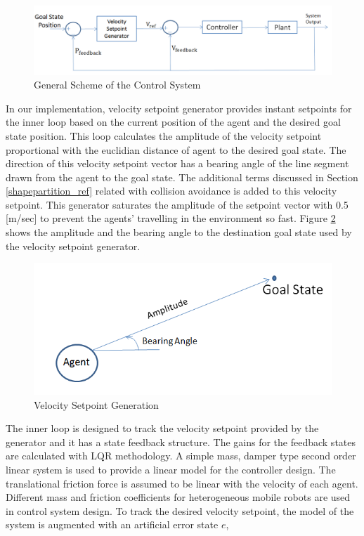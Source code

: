 \begin{figure}[H]
\caption{General Scheme of the Control System} \label{Controller_ref}
\centering
\includegraphics[scale = 0.45]{controller}
\end{figure}

In our implementation, velocity setpoint generator provides instant setpoints for the inner loop based on the current position of the agent and the desired goal state position.  This loop calculates the amplitude of the velocity setpoint proportional with the euclidian distance of agent to the desired goal state. The direction of this velocity setpoint vector has a bearing angle of the line segment drawn from the agent to the goal state. The additional terms discussed in Section \ref{shapepartition_ref} related with collision avoidance is added to this velocity setpoint. This generator saturates the amplitude of the setpoint vector with 0.5 [m/sec] to prevent the agents' travelling in the environment so fast. Figure \ref{velocity_sp_generation} shows the amplitude and the bearing angle to the destination goal state used by the velocity setpoint generator.

\begin{figure}[H]
\caption{Velocity Setpoint Generation} \label{velocity_sp_generation}
\centering
\includegraphics[scale = 0.50]{bearing}
\end{figure}

The inner loop is designed to track the velocity setpoint provided by the generator and it has a state feedback structure. The gains for the feedback states are calculated with LQR methodology. A simple mass, damper type second order linear system is used to provide a linear model for the controller design. The translational friction force is assumed to be linear with the velocity of each agent. Different mass and friction coefficients for heterogeneous mobile robots are used in control system design. To track the desired velocity setpoint, the model of the system is augmented with an artificial error state $e$,

